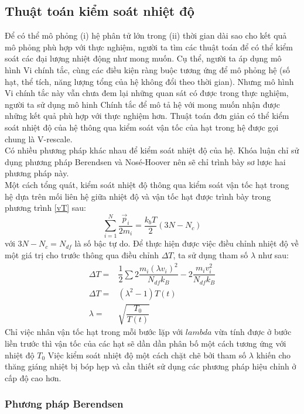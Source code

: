 \documentclass[12pt,a4paper,reqno, oneside]{book}
\begin{document}
	\subsection{Thuật toán kiểm soát nhiệt độ}
%	
		Để có thể mô phỏng (i) hệ phân tử lớn trong (ii) thời gian dài sao cho kết quả mô phỏng phù hợp với thực nghiệm, người ta tìm các thuật toán để có thể kiểm soát các đại lượng nhiệt động như mong muốn. Cụ thể, người ta áp dụng mô hình Vi chính tắc, cùng các điều kiện ràng buộc tương ứng để mô phỏng hệ (số hạt, thể tích, năng lượng tổng của hệ không đổi theo thời gian). Nhưng mô hình Vi chính tắc này vẫn chưa đem lại những quan sát có được trong thực nghiệm, người ta sử dụng mô hinh Chính tắc để mô tả hệ với mong muốn nhận được những kết quả phù hợp với thực nghiệm hơn. Thuật toán đơn giản có thể kiểm soát nhiệt độ của hệ thông qua kiểm soát vận tốc của hạt trong hệ được gọi chung là V-rescale.\\
		Có nhiều phương pháp khác nhau để kiểm soát nhiệt độ của hệ. Khóa luận chỉ sử dụng phương pháp Berendsen và Nosé-Hoover nên sẽ chỉ trình bày sơ lược hai phương pháp này.\\
		Một cách tổng quát, kiểm soát nhiệt độ thông qua kiểm soát vận tốc hạt trong hệ dựa trên mối liên hệ giữa nhiệt độ và vận tốc hạt được trình bày trong phương trình \eqref{vT} sau:
		\begin{equation}
		\sum_{i=1}^{N} \dfrac{\vec{p}_{i}}{2m_{i}} = \dfrac{k_{b}T}{2}\left(3N-N_{c}\right)
		\label{vT}
		\end{equation}
		với $3N - N_{c} = N_{df}$ là số bậc tự do.
		Để thực hiện được việc điều chỉnh nhiệt độ về một giá trị cho trước thông qua điều chỉnh $\Delta T$, ta sử dụng tham số $\lambda$ như sau:
		\begin{align}
		\Delta T = & \dfrac{1}{2} \sum 2\dfrac{m_{i}\left(\lambda v_{i}\right)^{2}}{N_{df} k_{B}} - 2\dfrac{m_{i} v_{i}^{2}}{N_{df} k_{B}}\\
		\Delta T = & \left(\lambda^{2} - 1\right) T\left(t\right)\\
		\lambda = &  \sqrt{\dfrac{T_{0}}{T\left(t\right)}}
		\end{align}
		Chỉ việc nhân vận tốc hạt trong mỗi bước lặp với $lambda$ vừa tính được ở bước liền trước thì vận tốc của các hạt sẽ dần dần phân bố một cách tương ứng với nhiệt độ $T_{0}$
		Việc kiểm soát nhiệt độ một cách chặt chẽ bởi tham số $\lambda$ khiến cho thăng giáng nhiệt bị bóp hẹp và cần thiết sử dụng các phương pháp hiệu chỉnh ở cấp độ cao hơn.
		\subsubsection{Phương pháp Berendsen}
		
\end{document}
